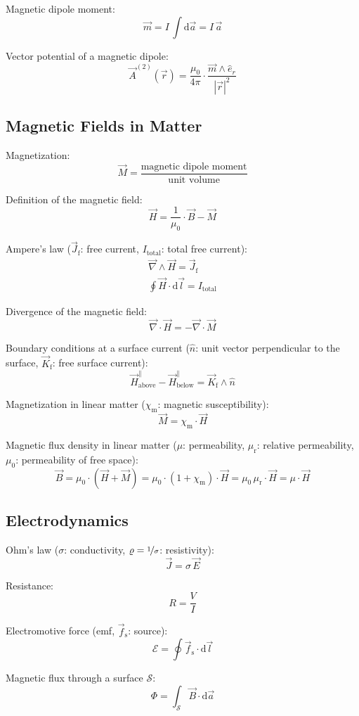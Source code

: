 \documentclass[fontsize=11pt,a4paper]{scrartcl}
\begin{document}
Magnetic dipole moment:
\[
	\vec m=I\,\int\mathrm{d}\vec a=I\,\vec a
\]

Vector potential of a magnetic dipole:
\[
	\vec A^{(2)}(\vec r)=\frac{\mu_0}{4\pi}\cdot\frac{\vec m\wedge\hat e_r}{|\vec r|^2}
\]
%
%
%
%
\subsection{Magnetic Fields in Matter}
Magnetization:
\[
	\vec M=\frac{\text{magnetic dipole moment}}{\text{unit volume}}
\]

Definition of the magnetic field:
\[
	\vec H=\frac{1}{\mu_0}\cdot\vec B-\vec M
\]

Ampere's law ($\vec J_\mathrm{f}$: free current, $I_\mathrm{total}$: total free current):
\begin{gather*}
	\vec\nabla\wedge\vec H=\vec J_\mathrm{f}\\
	\oint\vec H\cdot\mathrm{d}\vec l=I_\mathrm{total}
\end{gather*}

Divergence of the magnetic field:
\[
	\vec\nabla\cdot\vec H=-\vec\nabla\cdot\vec M
\]

Boundary conditions at a surface current ($\hat n$: unit vector perpendicular to the surface, $\vec K_\mathrm{f}$: free surface current):
\[
	\vec H_\mathrm{above}^\parallel-\vec H_\mathrm{below}^\parallel=\vec K_\mathrm{f}\wedge\hat n
\]

Magnetization in linear matter ($\chi_\mathrm{m}$: magnetic susceptibility):
\[
	\vec M=\chi_\mathrm{m}\cdot\vec H
\]

Magnetic flux density in linear matter ($\mu$: permeability, $\mu_\mathrm{r}$: relative permeability,\\ $\mu_0$: permeability of free space):
\[
	\vec B=\mu_0\cdot(\vec H+\vec M)=\mu_0\cdot(1+\chi_\mathrm{m})\cdot\vec H=\mu_0\,\mu_\mathrm{r}\cdot\vec H=\mu\cdot\vec H
\]
%
%
%
%
\subsection{Electrodynamics}
Ohm's law ($\sigma$: conductivity, $\varrho=\nicefrac{1}{\sigma}$: resistivity):
\[
	\vec J=\sigma\,\vec E
\]

Resistance:
\[
	R=\frac{V}{I}
\]

Electromotive force (emf, $\vec f_\mathrm{s}$: source):
\[
	\mathcal{E}=\oint \vec f_\mathrm{s}\cdot\mathrm{d}\vec l
\]

Magnetic flux through a surface $\mathcal{S}$:
\[
	\Phi=\int_\mathcal{S}\vec B\cdot\mathrm{d}\vec a
\]
\end{document}
